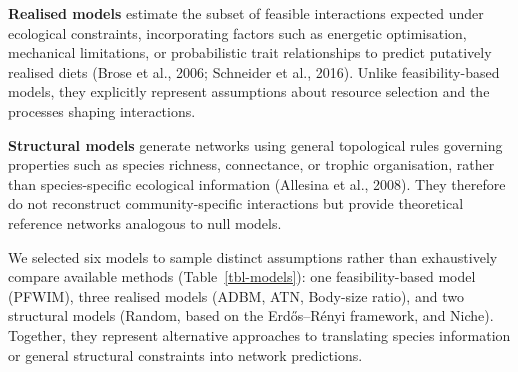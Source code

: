\documentclass[
]{article}
\begin{document}
\textbf{Realised models} estimate the subset of feasible interactions
expected under ecological constraints, incorporating factors such as
energetic optimisation, mechanical limitations, or probabilistic trait
relationships to predict putatively realised diets (Brose et al., 2006;
Schneider et al., 2016). Unlike feasibility-based models, they
explicitly represent assumptions about resource selection and the
processes shaping interactions.

\textbf{Structural models} generate networks using general topological
rules governing properties such as species richness, connectance, or
trophic organisation, rather than species-specific ecological
information (Allesina et al., 2008). They therefore do not reconstruct
community-specific interactions but provide theoretical reference
networks analogous to null models.

We selected six models to sample distinct assumptions rather than
exhaustively compare available methods (Table~\ref{tbl-models}): one
feasibility-based model (PFWIM), three realised models (ADBM, ATN,
Body-size ratio), and two structural models (Random, based on the
Erdős--Rényi framework, and Niche). Together, they represent alternative
approaches to translating species information or general structural
constraints into network predictions.
\end{document}

